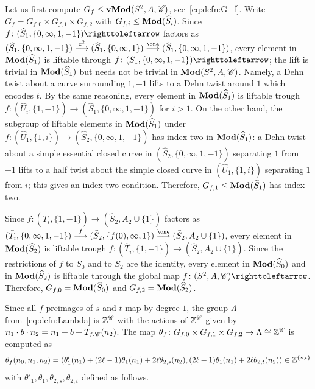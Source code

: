 \documentclass{amsart}
\begin{document}
Let us first compute $G_f\le \Mod[v](S^2,A,\CC)$,
see~\eqref{eq:defn:G_f}. Write
$G_{f}=G_{f,0}\times G_{f,1}\times G_{f,2}$ with
$G_{f,i}\le \Mod(\widehat S_i)$. Since
$f\colon (\widehat S_1, \{0,\infty, 1,-1\})\selfmap$ factors as
$ (\widehat S_1, \{0,\infty, 1,-1\})\overset{z^2}{\longrightarrow}
(\widehat S_1, \{0,\infty, 1\}) \overset{\one}{\longrightarrow}
(\widehat S_1, \{0,\infty, 1,-1\})$, every element in
$\Mod(\widehat S_1)$ is liftable through
$f\colon (S_1, \{0,\infty, 1,-1\})\selfmap$; the lift is trivial in
$\Mod(\widehat S_1)$ but needs not be trivial in
$\Mod(S^2,A,\CC)$. Namely, a Dehn twist about a curve surrounding
$1,-1$ lifts to a Dehn twist around $1$ which encodes $t$. By the same
reasoning, every element in $\Mod(\widehat S_1)$ is liftable trough
$f\colon (\widehat U_i,\{1,-1\})\to (\widehat S_1, \{0,\infty, 1,-1\})$ for $i>1$. On
the other hand, the subgroup of liftable elements in
$\Mod(\widehat S_1)$ under
$f\colon (\widehat U_1,\{1,i\})\to (\widehat S_2,\{0,\infty, 1,-1\})$
has index two in $\Mod(\widehat S_1)$: a Dehn twist about a simple
essential closed curve in $(\widehat S_2,\{0,\infty, 1,-1\})$
separating $1$ from $-1$ lifts to a half twist about the simple closed
curve in $(\widehat U_1,\{1,i\})$ separating $1$ from $i$; this gives
an index two condition. Therefore, $G_{f,1}\le \Mod(\widehat S_1)$ has
index two.

Since
$f\colon (\widehat T_i, \{ 1,-1\})\to (\widehat S_2,A_2\cup \{1\})$
factors as
$ (\widehat T_i, \{0,\infty, 1,-1\})\overset{f}{\longrightarrow}
(\widehat S_2, \{f(0),\infty, 1\}) \overset{\one}{\longrightarrow}
(\widehat S_2, A_2\cup \{ 1\})$, every element in $\Mod(\widehat S_2)$
is liftable trough
$f\colon (\widehat T_i,\{1,-1\})\to (\widehat S_2, A_2\cup \{
1\})$. Since the restrictions of $f$ to $S_0$ and to $S_2$ are the
identity, every element in $\Mod(\widehat S_0)$ and in
$\Mod(\widehat S_2)$ is liftable through the global map
$f\colon (S^2,A,\CC)\selfmap$. Therefore, $G_{f,0}=\Mod(\widehat S_0)$
and $G_{f,2}=\Mod(\widehat S_2)$.

Since all $f$-preimages of $s$ and $t$ map by degree $1$, the group
$\Lambda$ from~\eqref{eq:defn:Lambda} is $\Z^{\CC}$ with the actions
of $\Z^{\CC}$ given by $n_1\cdot b\cdot n_2=
n_1+b+T_{f,\CC}(n_2)$. The map
$\theta_f\colon G_{f,0}\times G_{f,1}\times G_{f,2}\to \Lambda
\cong\Z^{\CC}$ is computed as
\begin{equation}
\label{eq:Ex:Defn:theta_f}
\theta_f(n_0,n_1,n_2) =(\theta'_1(n_1)+(2\ell-1)\theta_{1}(n_1)+ 2\ell \theta_{2,s}(n_2), (2\ell+1)\theta_{1}(n_1)+2\ell \theta_{2,t}(n_2))\in \Z^{\{s,t\}}
\end{equation}
with $\theta'_1,\theta_1, \theta_{2,s},\theta_{2,t}$ defined as follows.
\end{document}

